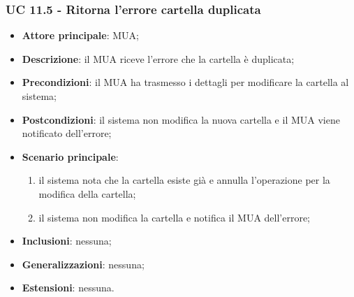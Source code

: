 \subsubsection{UC 11.5 - Ritorna l'errore cartella duplicata} \label{sec:UC11.5}
\begin{itemize}
    \item \textbf{Attore principale}: MUA;
    \item \textbf{Descrizione}: il MUA riceve l'errore che la cartella è duplicata;
    \item \textbf{Precondizioni}: il MUA ha trasmesso i dettagli per modificare la cartella al sistema;
    \item \textbf{Postcondizioni}: il sistema non modifica la nuova cartella e il MUA viene notificato dell'errore;
    \item \textbf{Scenario principale}:
        \begin{enumerate}
            \item il sistema nota che la cartella esiste già e annulla l'operazione per la modifica della cartella;
            \item il sistema non modifica la cartella e notifica il MUA dell'errore;
        \end{enumerate}
    \item \textbf{Inclusioni}: nessuna;
    \item \textbf{Generalizzazioni}: nessuna;
    \item \textbf{Estensioni}: nessuna.
\end{itemize}

